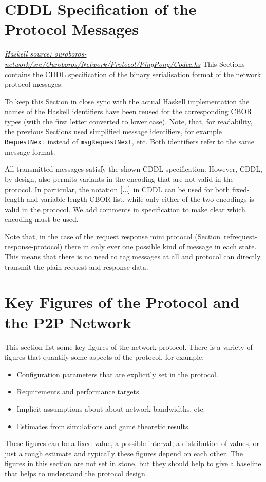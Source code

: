\documentclass{report}
\newcommand{\hsref}[1]{\href{https://github.com/input-output-hk/ouroboros-network/blob/master/#1}{\emph{Haskell source: #1}}}
\newcommand{\wip}[1]{\color{magenta}{#1}\color{black}}
\theoremstyle{definition}{
  \newtheorem{lemma}{Lemma}[section] %
  \newtheorem{definition}[lemma]{Definition}
}
\theoremstyle{theorem}{
  \newtheorem{invariant}[lemma]{Invariant}
  \newtheorem{proofobligation}[lemma]{Proof Obligation}
}
\numberwithin{equation}{lemma}
\begin{document}
\appendix
\chapter{CDDL Specification of the Protocol Messages}
\label{CBOR-section}
\hsref{ouroboros-network/src/Ouroboros/Network/Protocol/PingPong/Codec.hs}
\label{included-cddl}
This Sections contains the CDDL\cite{cddl} specification
of the binary serialisation format of the network protocol messages.

To keep this Section in close sync with the actual Haskell implementation
the names of the Haskell identifiers have been reused for the corresponding
CBOR types (with the first letter converted to lower case).
Note, that, for readability, the previous Sections used simplified message identifiers,
for example {\tt RequestNext} instead of {\tt msgRequestNext}, etc.
Both identifiers refer to the same message format.

All transmitted messages satisfy the shown CDDL specification.
However, CDDL, by design, also permits variants in the encoding that are not valid in the protocol.
In particular, the notation ${\tt [} ... {\tt ]}$ in CDDL can be used for both fixed-length  
and variable-length CBOR-list, while only either of the two encodings is valid in the protocol.
We add comments in specification to make clear which encoding must be used.

Note that, in the case of the request response mini protocol (Section~ref{request-response-protocol})
there in only ever one possible kind of message in each state.
This means that there is no need to tag messages at all and protocol can directly transmit the plain
request and response data.

\wip{TODO: test that haskell(message) => cddl(message) }




\chapter{Key Figures of the Protocol and the P2P Network}
This section list some key figures of the network protocol.
There is a variety of figures that quantify some aspects of the protocol, for example:
\begin{itemize}
\item Configuration parameters that are explicitly set in the protocol.
\item Requirements and performance targets.
\item Implicit assumptions about about network bandwidths, etc.
\item Estimates from simulations and game theoretic results.
\end{itemize}
These figures can be a fixed value, a possible interval, a distribution of values,
or just a rough estimate and typically these figures depend on each other.
The figures in this section are not set in stone, but they should help to give a baseline that helps
to understand the protocol design.
\end{document}
